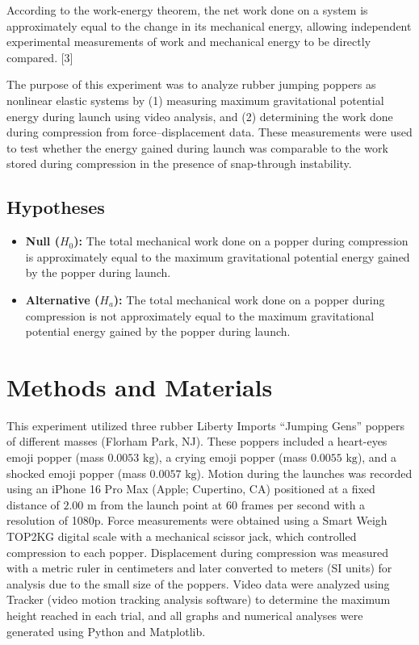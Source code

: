 \documentclass[12pt]{article}
\begin{document}
According to the work-energy theorem, the net work done on a system is approximately equal to the change in its mechanical energy, allowing independent experimental measurements of work and mechanical energy to be directly compared. [3]

The purpose of this experiment was to analyze rubber jumping poppers as nonlinear elastic systems by (1) measuring maximum gravitational potential energy during launch using video analysis, and (2) determining the work done during compression from force--displacement data. These measurements were used to test whether the energy gained during launch was comparable to the work stored during compression in the presence of snap-through instability.

\subsection*{Hypotheses}
\begin{itemize}
    \item \textbf{Null ($H_0$):} The total mechanical work done on a popper during compression is approximately equal to the maximum gravitational potential energy gained by the popper during launch.
    \item \textbf{Alternative ($H_a$):} The total mechanical work done on a popper during compression is not approximately equal to the maximum gravitational potential energy gained by the popper during launch.
\end{itemize}

\section{Methods and Materials}
This experiment utilized three rubber Liberty Imports ``Jumping Gens'' poppers of different masses (Florham Park, NJ). These poppers included a heart-eyes emoji popper (mass $0.0053\text{ kg}$), a crying emoji popper (mass $0.0055\text{ kg}$), and a shocked emoji popper (mass $0.0057\text{ kg}$). Motion during the launches was recorded using an iPhone 16 Pro Max (Apple; Cupertino, CA) positioned at a fixed distance of $2.00\text{ m}$ from the launch point at 60 frames per second with a resolution of 1080p. Force measurements were obtained using a Smart Weigh TOP2KG digital scale with a mechanical scissor jack, which controlled compression to each popper. Displacement during compression was measured with a metric ruler in centimeters and later converted to meters (SI units) for analysis due to the small size of the poppers. Video data were analyzed using Tracker (video motion tracking analysis software) to determine the maximum height reached in each trial, and all graphs and numerical analyses were generated using Python and Matplotlib. 
\end{document}
